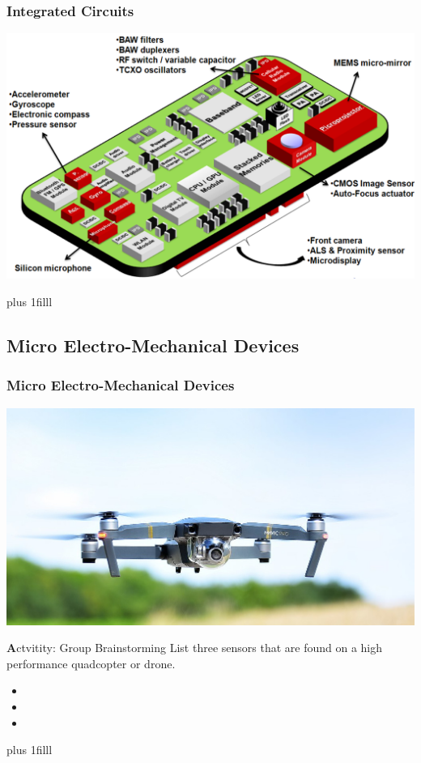 \documentclass[fleqn]{beamer} %
\newcommand{\sectionIIsubsectionItitle}{Integrated Circuits}
\newcommand{\sectionIIsubsectionIItitle}{Micro Electro-Mechanical Devices}
\newcommand{\btVFill}{\vskip0pt plus 1filll}
\begin{document}
		    \begin{frame}[label=sectionIIsubsectionI]
				\frametitle{\sectionIIsubsectionItitle}

				\includegraphics[scale=0.45]{images/Mobile_Device_Sensors.png}
	
				\btVFill	
		
			\end{frame}	

		\subsection{\sectionIIsubsectionIItitle}\label{sectionIIsubsectionII}

			\begin{frame}
				\frametitle{\sectionIIsubsectionIItitle}


				\includegraphics[scale=0.2]{images/Flying_DJI_Mavic_Pro_cropped.jpg}
	
				{\textbf Actvitity:} Group Brainstorming
				List three sensors that are found on a high performance quadcopter or drone.
				\begin{itemize}
					\item
					\item
					\item
				\end{itemize} 

			 	\btVFill


			\end{frame}
\end{document}
